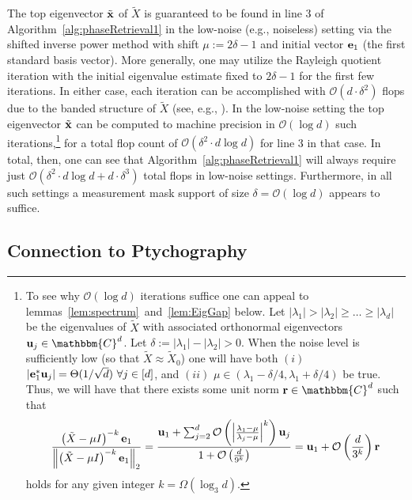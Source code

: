 The top eigenvector $\tilde{\mathbf x}$ of $\tilde{X}$ is guaranteed to be found in line 3 of Algorithm~\ref{alg:phaseRetrieval1} in the low-noise (e.g., noiseless) setting via the shifted inverse power method with shift $\mu := 2 \delta - 1$ and initial vector ${\bf e}_1$ (the first standard basis vector).  More generally, one may utilize the Rayleigh quotient iteration with the initial eigenvalue estimate fixed to $2 \delta - 1$ for the first few iterations.  In either case, each iteration can be accomplished with $\mathcal{O}(d \cdot \delta^2)$ flops due to the banded structure of $\tilde{X}$ (see, e.g., \cite{trefethen1997numerical}).  In the low-noise setting the top eigenvector $\tilde{\mathbf x}$ can be computed to machine precision in $\mathcal{O}(\log d)$ such iterations,\footnote{To see why $\mathcal{O}(\log d)$ iterations suffice one can appeal to lemmas~\ref{lem:spectrum}~and~\ref{lem:EigGap} below.  Let $|\lambda_1| > |\lambda_2| \geq \dots \geq |\lambda_d|$ be the eigenvalues of $\tilde{X}$ with associated orthonormal eigenvectors ${\bf u}_j \in \mathbbm{C}^d$.  Let $\delta := |\lambda_1| - |\lambda_2| > 0$.  When the noise level is sufficiently low (so that $\tilde{X} \approx \tilde{X}_0$) one will have both $(i)$ $|{\bf e}^*_1 {\bf u}_j| = \Theta(1/\sqrt{d})~\forall j \in [d]$, and $(ii)$ $\mu \in (\lambda_1-\delta/4, \lambda_1+\delta/4)$ be true.  Thus, we will have that there exists some unit norm ${\bf r} \in \mathbbm{C}^d$ such that $$\frac{\left( \tilde{X} - \mu I \right)^{-k}{\bf e}_1}{\left\| \left( \tilde{X} - \mu I \right)^{-k}{\bf e}_1 \right\|_2} = \frac{{\bf u}_1 + \sum^d_{j=2} \mathcal{O}\left( \left|\frac{\lambda_1 - \mu}{\lambda_j - \mu} \right|^k \right) {\bf u}_j}{1 + \mathcal{O}\left( \frac{d}{9^k} \right)} = {\bf u}_1 + \mathcal{O} \left( \frac{d}{3^k} \right) {\bf r}$$ holds for any given integer $k = \Omega \left( \log_3 d \right)$.} for a total flop count of $\mathcal{O}(\delta^2 \cdot d \log d)$ for line 3 in that case.  In total, then, one can see that Algorithm~\ref{alg:phaseRetrieval1} will always require just $\mathcal{O}(\delta^2 \cdot d \log d + d \cdot \delta^3)$ total flops in low-noise settings.  Furthermore, in all such settings a measurement mask support of size $\delta = \mathcal{O}(\log d)$ appears to suffice.

\subsection{Connection to Ptychography}
\label{sec:conn_pty}

